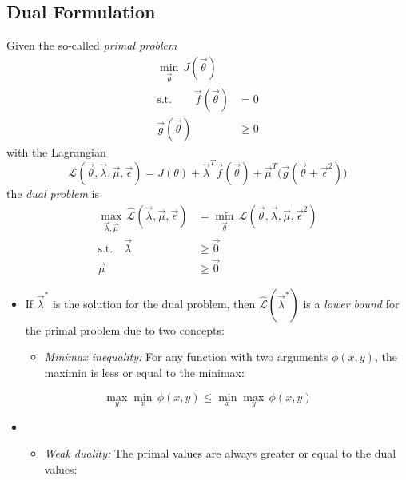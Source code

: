 		\subsection{Dual Formulation}
			Given the so-called \emph{primal problem}
			\begin{align}
				\min\limits_{\vec{\theta}} \, J(\vec{\theta}) & \\
				\textrm{s.t.} \qquad
				\vec{f}(\vec{\theta}) & = 0 \\
				\vec{g}(\vec{\theta}) &\geq 0
			\end{align}
			with the Lagrangian
			\begin{equation}
				\mathcal{L}(\vec{\theta}, \vec{\lambda}, \vec{\mu}, \vec{\epsilon}) = J(\theta) + \vec{\lambda}^T\vec{f}(\vec{\theta}) + \vec{\mu}^T \big(\vec{g}(\vec{\theta} + \vec{\epsilon}^2)\big)
			\end{equation}
			the \emph{dual problem} is
			\begin{align}
				\max\limits_{\vec{\lambda}, \vec{\mu}} \, \hat{\mathcal{L}}(\vec{\lambda}, \vec{\mu}, \vec{\epsilon}) &= \min\limits_{\vec{\theta}} \, \mathcal{L}(\vec{\theta}, \vec{\lambda}, \vec{\mu}, \vec{\epsilon}^2) \\
				\textrm{s.t.} \quad
				\vec{\lambda} &\geq \vec{0} \\
				\vec{\mu} &\geq \vec{0}
			\end{align}
			\begin{itemize}
				\item If \( \vec{\lambda}^\ast \) is the solution for the dual problem, then \( \hat{\mathcal{L}}(\vec{\lambda}^\ast) \) is a \emph{lower bound} for the primal problem due to two concepts:
					\begin{itemize}
						\item \emph{Minimax inequality:} For any function with two arguments \( \phi(x, y) \), the maximin is less or equal to the minimax:
					\end{itemize}
			\end{itemize}
			\begin{equation}
				\max_y \min_x \, \phi(x, y) \leq \min_x \max_y \, \phi(x, y)
			\end{equation}
			\begin{itemize}
				\item[]
					\begin{itemize}
						\item \emph{Weak duality:} The primal values are always greater or equal to the dual values:
					\end{itemize}
			\end{itemize}
